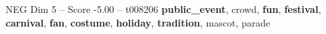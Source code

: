 \begin{textsample}{NEG Dim 5 – Score -5.00 – t008206}  \label{ex:f5_neg_038}
\textbf{public\_event}, crowd, \textbf{fun}, \textbf{festival}, \textbf{carnival}, \textbf{fan}, \textbf{costume}, \textbf{holiday}, \textbf{tradition}, mascot, parade

\end{textsample}

